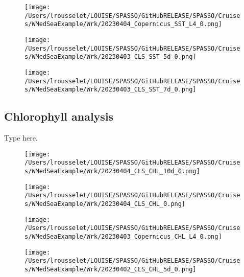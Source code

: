 \documentclass{article}%
\begin{document}
%


\begin{figure}[h!]%
\centering%
\texttt{[image: /Users/lrousselet/LOUISE/SPASSO/GitHubRELEASE/SPASSO/Cruises/WMedSeaExample/Wrk/20230404\_Copernicus\_SST\_L4\_0.png]}%
\end{figure}

%


\begin{figure}[h!]%
\centering%
\texttt{[image: /Users/lrousselet/LOUISE/SPASSO/GitHubRELEASE/SPASSO/Cruises/WMedSeaExample/Wrk/20230403\_CLS\_SST\_5d\_0.png]}%
\end{figure}

%


\begin{figure}[h!]%
\centering%
\texttt{[image: /Users/lrousselet/LOUISE/SPASSO/GitHubRELEASE/SPASSO/Cruises/WMedSeaExample/Wrk/20230403\_CLS\_SST\_7d\_0.png]}%
\end{figure}

%
\clearpage

%
\subsection{Chlorophyll analysis}%
\label{subsec:Chlorophyllanalysis}%
Type here.%


\begin{figure}[h!]%
\centering%
\texttt{[image: /Users/lrousselet/LOUISE/SPASSO/GitHubRELEASE/SPASSO/Cruises/WMedSeaExample/Wrk/20230404\_CLS\_CHL\_10d\_0.png]}%
\end{figure}

%


\begin{figure}[h!]%
\centering%
\texttt{[image: /Users/lrousselet/LOUISE/SPASSO/GitHubRELEASE/SPASSO/Cruises/WMedSeaExample/Wrk/20230404\_CLS\_CHL\_0.png]}%
\end{figure}

%


\begin{figure}[h!]%
\centering%
\texttt{[image: /Users/lrousselet/LOUISE/SPASSO/GitHubRELEASE/SPASSO/Cruises/WMedSeaExample/Wrk/20230403\_Copernicus\_CHL\_L4\_0.png]}%
\end{figure}

%


\begin{figure}[h!]%
\centering%
\texttt{[image: /Users/lrousselet/LOUISE/SPASSO/GitHubRELEASE/SPASSO/Cruises/WMedSeaExample/Wrk/20230402\_CLS\_CHL\_5d\_0.png]}%
\end{figure}
\end{document}
